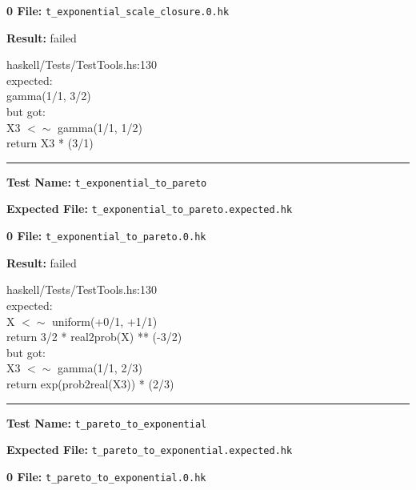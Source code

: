 \documentclass[11pt]{article}
\begin{document}
\bigskip
\textbf{0 File:} {\tt t\_exponential\_scale\_closure.0.hk}

\bigskip


\bigskip
\textbf{Result:} failed

\bigskip
\noindent


\bigskip
\noindent
haskell/Tests/TestTools.hs:130\\expected:\\gamma(1/1, 3/2)\\but got:\\X3 $<\sim$ gamma(1/1, 1/2)\\return X3 * (3/1)\\

\hrule

\bigskip
\textbf{Test Name:} {\tt t\_exponential\_to\_pareto}

\textbf{Expected File:} {\tt t\_exponential\_to\_pareto.expected.hk}

\bigskip


\bigskip
\textbf{0 File:} {\tt t\_exponential\_to\_pareto.0.hk}

\bigskip


\bigskip
\textbf{Result:} failed

\bigskip
\noindent


\bigskip
\noindent
haskell/Tests/TestTools.hs:130\\expected:\\X $<\sim$ uniform(+0/1, +1/1)\\return 3/2 * real2prob(X) ** (-3/2)\\but got:\\X3 $<\sim$ gamma(1/1, 2/3)\\return exp(prob2real(X3)) * (2/3)\\

\hrule

\bigskip
\textbf{Test Name:} {\tt t\_pareto\_to\_exponential}

\textbf{Expected File:} {\tt t\_pareto\_to\_exponential.expected.hk}

\bigskip


\bigskip
\textbf{0 File:} {\tt t\_pareto\_to\_exponential.0.hk}
\end{document}
